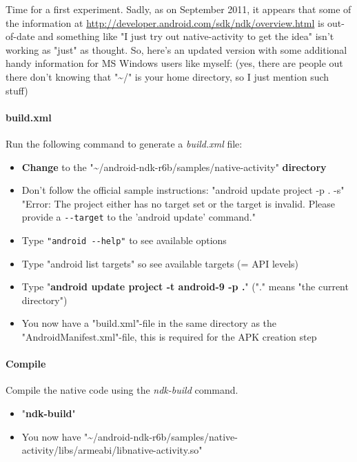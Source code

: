 Time for a first experiment. Sadly, as on September 2011, it appears that some of the information at \url{http://developer.android.com/sdk/ndk/overview.html} is out-of-date and something like "I just try out native-activity to get the idea" isn't working as "just" as thought. So, here's an updated version with some additional handy information for \ac{MS} Windows users like myself: (yes, there are people out there don't knowing that "\textasciitilde /" is your home directory, so I just mention such stuff)


\paragraph{build.xml}
Run the following command to generate a \emph{build.xml} file:
\begin{itemize}
\item{\textbf{Change} to the "\textasciitilde /android-ndk-r6b/samples/native-activity" \textbf{directory}}
\item{\textrightarrow{} Don't follow the official sample instructions: "android update project -p . -s" \textrightarrow{} "Error: The project either has no target set or the target is invalid. Please provide a \verb+--target+ to the 'android update' command."}
\item{\textrightarrow{} Type \verb+"android --help"+ to see available options}
\item{\textrightarrow{} Type "android list targets" so see available targets (= \ac{API} levels)}
\item{Type "\textbf{android update project -t android-9 -p .}" ("." means "the current directory")}
\item{\textrightarrow{} You now have a "build.xml"-file in the same directory as the "AndroidManifest.xml"-file, this is required for the \ac{APK} creation step}
\end{itemize}


\paragraph{Compile}
Compile the native code using the \emph{ndk-build} command.
\begin{itemize}
\item{"\textbf{ndk-build}"}
\item{\textrightarrow{} You now have "\textasciitilde /android-ndk-r6b/samples/native-activity/libs/armeabi/libnative-activity.so"}
\end{itemize}


